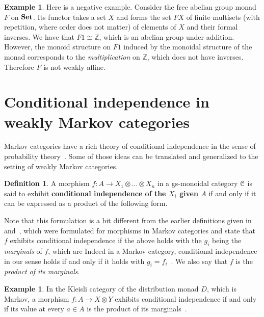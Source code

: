 \documentclass[a4paper,UKenglish,numberwithinsect,cleveref, autoref, thm-restate]{lipics-v2021}
\theoremstyle{plain} %
\theoremstyle{definition} %
\newtheorem{mydefinition}[mytheorem]{Definition}
\newtheorem{myexample}[mytheorem]{Example}
\begin{document}
\begin{myexample}
    \label{ex:nonexample}
    Here is a negative example.
    Consider the free abelian group monad $F$ on $\mathbf{Set}$. Its functor takes a set $X$ and forms the set $FX$ of finite multisets (with repetition, where order does not matter) of elements of $X$ and their formal inverses. 
    We have that $F1\cong \mathbb{Z}$, which is an abelian group under addition. 
    However, the monoid structure on $F1$ induced by the monoidal structure of the monad corresponds to the \emph{multiplication} on $\mathbb{Z}$, which does not have inverses. Therefore $F$ is not weakly affine. 
\end{myexample}


\section{Conditional independence in weakly Markov categories}
\label{secindep}

Markov categories have a rich theory of conditional independence in the sense of probability theory~\cite{fritz2022dseparation}. 
Some of those ideas can be translated and generalized to the setting of weakly Markov categories. 

\begin{mydefinition}\label{defcondind}
 A morphism $f:A\to X_1\otimes\dots\otimes X_n$ in a gs-monoidal category $\mathcal{C}$ is said to exhibit \textbf{conditional independence of the $X_i$ given $A$} if and only if it can be expressed as a product of the following form.
\end{mydefinition}

Note that this formulation is a bit different from the earlier definitions given in \cite[Definition~6.6]{cho_jacobs_2019} and~\cite[Definition~12.12]{Fritz_2020}, which were formulated for morphisms in Markov categories and state that $f$ exhibits conditional independence if the above holds with the $g_i$ being the \emph{marginals} of $f$, which are
Indeed in a Markov category, conditional independence in our sense holds if and only if it holds with $g_i = f_i$~\cite[Lemma~12.11]{Fritz_2020}.
We also say that $f$ is the \emph{product of its marginals}.

\begin{myexample}
 In the Kleisli category of the distribution monad $D$, which is Markov, a morphism $f:A\to X\otimes Y$ exhibits conditional independence if and only if its value at every $a \in A$ is the product of its marginals~\cite[Section~12]{Fritz_2020}.
\end{myexample}
\end{document}
